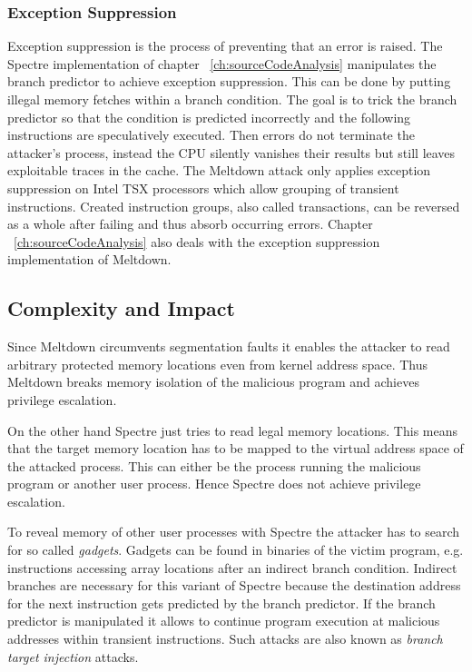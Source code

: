 \documentclass[a4paper,oneside,openright] {scrreprt}
\begin{document}
\subsubsection{Exception Suppression}

Exception suppression is the process of preventing that an error is raised. 
The Spectre implementation of chapter ~\ref{ch:sourceCodeAnalysis} manipulates the branch predictor to achieve exception suppression.
This can be done by putting illegal memory fetches within a branch condition. 
The goal is to trick the branch predictor so that the condition is predicted incorrectly and the following
instructions are speculatively executed.
Then errors do not terminate the attacker's process, instead the CPU silently vanishes their results
 but still leaves exploitable traces in the cache.
The Meltdown attack only applies exception suppression on Intel TSX processors which allow grouping of transient instructions.
Created instruction groups, also called transactions, can be reversed as a whole after failing and thus absorb occurring errors.
Chapter ~\ref{ch:sourceCodeAnalysis} also deals with the exception suppression implementation of Meltdown.

\subsection{Complexity and Impact}
\label{ch:intro:motivation:A}

Since Meltdown circumvents segmentation faults it enables the attacker to read arbitrary protected memory locations 
even from kernel address space.
Thus Meltdown breaks memory isolation of the malicious program and achieves privilege escalation. 

On the other hand Spectre just tries to read legal memory locations.
This means that the target memory location has to be mapped to the virtual address space of the attacked process.
This can either be the process running the malicious program or another user process.
Hence Spectre does not achieve privilege escalation.

To reveal memory of other user processes with Spectre the attacker has to search for so called \textit{gadgets}.
Gadgets can be found in binaries of the victim program, e.g. instructions accessing array locations after an indirect branch condition.
Indirect branches are necessary for this variant of Spectre because the destination address for the next instruction gets predicted 
by the branch predictor.
If the branch predictor is manipulated it allows to continue program execution at malicious addresses within transient instructions. 
Such attacks are also known as \textit{branch target injection} attacks.
\end{document}
